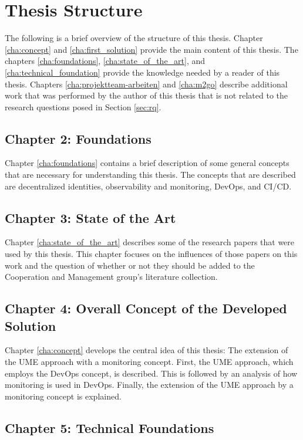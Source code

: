 \section{Thesis Structure}
\label{sec:thesis_structure}

The following is a brief overview of the structure of this thesis. Chapter \ref{cha:concept} and \ref{cha:first_solution}
provide the main content of this thesis. The chapters \ref{cha:foundations}, \ref{cha:state_of_the_art}, and
\ref{cha:technical_foundation} provide the knowledge needed by a reader of this thesis.
Chapters \ref{cha:projektteam-arbeiten} and \ref{cha:m2go} describe additional work that was performed
by the author of this thesis that is not related to the research questions posed in Section \ref{sec:rq}.

\subsection*{Chapter 2: Foundations}

Chapter \ref{cha:foundations} contains a brief description of some general concepts
that are necessary for understanding this thesis. The concepts that are described
are decentralized identities, observability and monitoring, DevOps, and CI/CD.

\subsection*{Chapter 3: State of the Art}

Chapter \ref{cha:state_of_the_art} describes some of the research papers that were
used by this thesis. This chapter focuses on the influences of those papers on this
work and the question of whether or not they should be added to the Cooperation and Management
group's literature collection.

\subsection*{Chapter 4: Overall Concept of the Developed Solution}

Chapter \ref{cha:concept} develops the central idea of this thesis: The extension
of the UME approach with a monitoring concept. First, the UME approach,
which employs the DevOps concept, is described. This is followed by an analysis
of how monitoring is used in DevOps. Finally, the extension of the UME approach
by a monitoring concept is explained.

\subsection*{Chapter 5: Technical Foundations}

